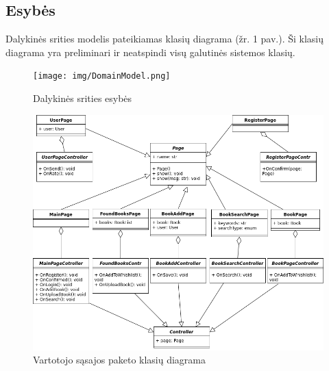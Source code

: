 \documentclass{VUMIFPSkursinis}
\begin{document}
	\subsection{Esybės}
		Dalykinės srities modelis pateikiamas klasių diagrama (žr. 1 pav.). Ši klasių diagrama yra
		preliminari ir neatspindi visų galutinės sistemos klasių.
		\begin{figure}[H]
			\centering
			\texttt{[image: img/DomainModel.png]}
			\caption{Dalykinės srities esybės}
			\label{img:psi2-domain-model}
		\end{figure}
		\begin{figure}[H]
			\centering
			\includegraphics[scale=0.6]{img/UI-ClassDiagram.png}
			\caption{Vartotojo sąsajos paketo klasių diagrama}
			\label{img:psi2-ui-class}
		\end{figure}
\end{document}
